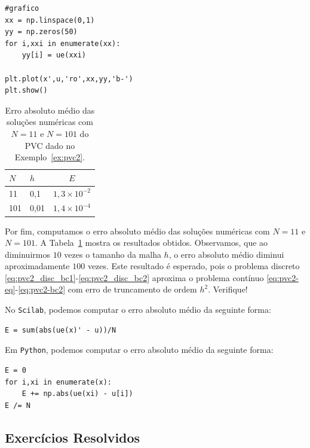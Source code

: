 \begin{sol}
\begin{verbatim}
#grafico
xx = np.linspace(0,1)
yy = np.zeros(50)
for i,xxi in enumerate(xx):
    yy[i] = ue(xxi)

plt.plot(x',u,'ro',xx,yy,'b-')
plt.show()
\end{verbatim}
\fi

\begin{table}
  \centering
  \caption{Erro absoluto médio das soluções numéricas com $N=11$ e $N=101$ do PVC dado no Exemplo~\ref{ex:pvc2}.}
  \begin{tabular}{ll|c}
    $N$ & $h$ & $E$\\\hline
    11 & 0,1 & $1,3\times 10^{-2}$\\
    101 & 0,01 & $1,4\times 10^{-4}$
  \end{tabular}
  \label{tab:pvc2_erro}
\end{table}

Por fim, computamos o erro absoluto médio das soluções numéricas com $N=11$ e $N=101$. A Tabela~\ref{tab:pvc2_erro} mostra os resultados obtidos. Observamos, que ao diminuirmos $10$ vezes o tamanho da malha $h$, o erro absoluto médio diminui aproximadamente $100$ vezes. Este resultado é esperado, pois o problema discreto \eqref{eq:pvc2_disc_bc1}-\eqref{eq:pvc2_disc_bc2} aproxima o problema contínuo \eqref{eq:pvc2-eq}-\eqref{eq:pvc2-bc2} com erro de truncamento de ordem $h^2$. Verifique!

\ifisscilab
No \verb+Scilab+, podemos computar o erro absoluto médio da seguinte forma:
\begin{verbatim}
E = sum(abs(ue(x)' - u))/N
\end{verbatim}
\fi
\ifispython
Em \verb+Python+, podemos computar o erro absoluto médio da seguinte forma:
\begin{verbatim}
E = 0
for i,xi in enumerate(x):
    E += np.abs(ue(xi) - u[i])
E /= N
\end{verbatim}
\fi
\end{sol}

\subsection*{Exercícios Resolvidos}


